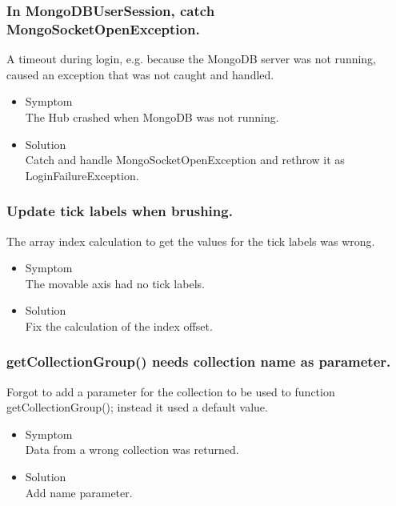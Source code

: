 \documentclass[oneside, english, final]{design}
\begin{document}
\subsubsection{In MongoDBUserSession, catch MongoSocketOpenException.}

A timeout during login, e.g. because the MongoDB server was not running, caused an exception that was not caught and handled.

\begin{itemize}
      \item{Symptom
            \\
            The Hub crashed when MongoDB was not running.
	}
      \item{Solution
            \\
            Catch and handle MongoSocketOpenException and rethrow it as LoginFailureException.
            }
\end{itemize}


\subsubsection{Update tick labels when brushing.}

The array index calculation to get the values for the tick labels was wrong.

\begin{itemize}
      \item{Symptom
            \\
            The movable axis had no tick labels.
	}
      \item{Solution
            \\
            Fix the calculation of the index offset.
            }
\end{itemize}
\subsubsection{getCollectionGroup() needs collection name as parameter.}

Forgot to add a parameter for the collection to be used to function getCollectionGroup(); instead it used a default value.

\begin{itemize}
      \item{Symptom
            \\
            Data from a wrong collection was returned.
	}
      \item{Solution
            \\
            Add name parameter.
            }
\end{itemize}
\end{document}
